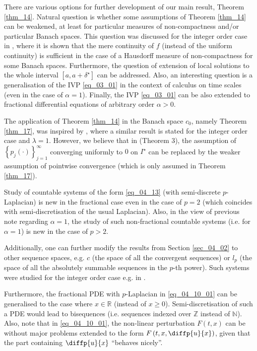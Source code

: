 \documentclass[reqno]{amsart}
\numberwithin{equation}{section}
\theoremstyle{definition}
\theoremstyle{remark}
\newcommand{\br}[1]{\left(#1\right)}
\newcommand{\cbr}[1]{\left\{#1\right\}}
\newcommand{\N}{\mathbb{N}}
\newcommand{\R}{\mathbb{R}}
\newcommand{\sbr}[1]{\left[#1\right]}
\newcommand{\sdelta}{\delta^{\star}}
\newcommand{\sectionRef}[1]{\textrm{Section \ref{#1}}}
\newcommand{\sI}{I^{\star}}
\newcommand{\theoremRef}[1]{\textrm{Theorem \ref{#1}}}
\newcommand{\Z}{\mathbb{Z}}
\begin{document}
	There are various options for further development of our main result, \theoremRef{thm_14}. Natural question is whether some assumptions of \theoremRef{thm_14} can be weakened, at least for particular measures of non-compactness and/or particular Banach spaces. This question was discussed for the integer order case in \cite{Monch}, where it is shown that the mere continuity of $f$ (instead of the uniform continuity) is sufficient in the case of a Hausdorff measure of non-compactness for some Banach spaces. Furthermore, the question of extension of local solutions to the whole interval $\sbr{a,a+\sdelta}$ can be addressed. Also, an interesting question is a generalisation of the IVP \eqref{eq_03_01} in the context of calculus on time scales (even in the case of $\alpha=1$). Finally, the IVP \eqref{eq_03_01} can be also extended to fractional differential equations of arbitrary order $\alpha>0$.
	
	The application of \theoremRef{thm_14} in the Banach space $c_0$, namely \theoremRef{thm_17}, was inspired by \cite{Banas_paper_SolvabilityOfInifiniteSystems}, where a similar result is stated for the integer order case and $\lambda=1$. However, we believe that in \cite{Banas_paper_SolvabilityOfInifiniteSystems} (Theorem $3$), the assumption of $\cbr{p_j\br{\cdot}}_{j=1}^{\infty}$ converging uniformly to $0$ on $\sI$ can be replaced by the weaker assumption of pointwise convergence (which is only assumed in \theoremRef{thm_17}).
	
	Study of countable systems of the form \eqref{eq_04_13} (with semi-discrete $p$-Laplacian) is new in the fractional case even in the case of $p=2$ (which coincides with semi-discretisation of the usual Laplacian). Also, in the view of previous note regarding $\alpha=1$, the study of such non-fractional countable systems (i.e. for $\alpha=1$) is new in the case of $p>2$.
	
	Additionally, one can further modify the results from \sectionRef{sec_04_02} to other sequence spaces, e.g. $c$ (the space of all the convergent sequences) or $l_p$ (the space of all the absolutely summable sequences in the $p$-th power). Such systems were studied for the integer order case e.g. in \cite{Banas_paper_SolvabilityOfInifiniteSystems}.
	
	Furthermore, the fractional PDE with $p$-Laplacian in \eqref{eq_04_10_01} can be generalised to the case where $x\in\R$ (instead of $x\geq0$). Semi-discretisation of such a PDE would lead to bisequences (i.e. sequences indexed over $\Z$ instead of $\N$). Also, note that in \eqref{eq_04_10_01}, the non-linear perturbation $F\br{t,x}$ can be without major problems extended to the form $F\br{t,x,\diffp{u}{x}}$, given that the part containing $\diffp{u}{x}$ \enquote{behaves nicely}.
	
\end{document}
